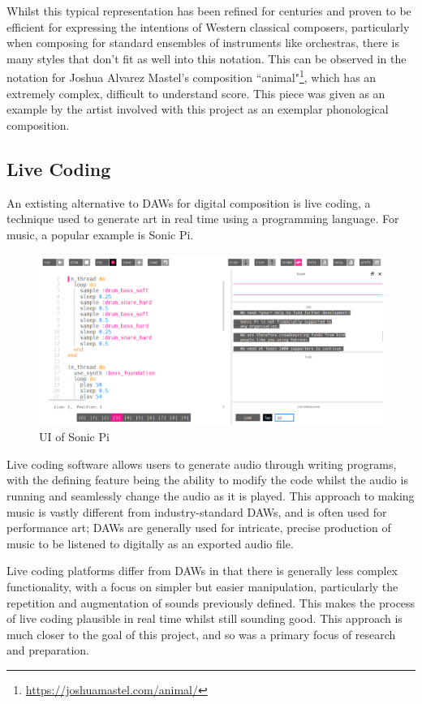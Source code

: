 \documentclass[12pt,a4paper,oneside,openright]{report}
\begin{document}
Whilst this typical representation has been refined for centuries and proven to be efficient for expressing the intentions of Western classical composers, particularly when composing for standard ensembles of instruments like orchestras, there is many styles that don't fit as well into this notation. This can be observed in the notation for Joshua Alvarez Mastel's composition ``animal"\footnote{\url{https://joshuamastel.com/animal/}}, which has an extremely complex, difficult to understand score. This piece was given as an example by the artist involved with this project as an exemplar phonological composition.

\subsection{Live Coding}
An extisting alternative to DAWs for digital composition is live coding, a technique used to generate art in real time using a programming language. For music, a popular example is Sonic Pi.

\begin{figure}[h]
    \centering
    \includegraphics[scale=0.4]{images/sonicpi.png}
    \caption{UI of Sonic Pi}
    \label{fig:sonic_pi}
\end{figure}

Live coding software allows users to generate audio through writing programs, with the defining feature being the ability to modify the code whilst the audio is running and seamlessly change the audio as it is played. This approach to making music is vastly different from industry-standard DAWs, and is often used for performance art; DAWs are generally used for intricate, precise production of music to be listened to digitally as an exported audio file.

Live coding platforms differ from DAWs in that there is generally less complex functionality, with a focus on simpler but easier manipulation, particularly the repetition and augmentation of sounds previously defined. This makes the process of live coding plausible in real time whilst still sounding good. This approach is much closer to the goal of this project, and so was a primary focus of research and preparation.
\end{document}
